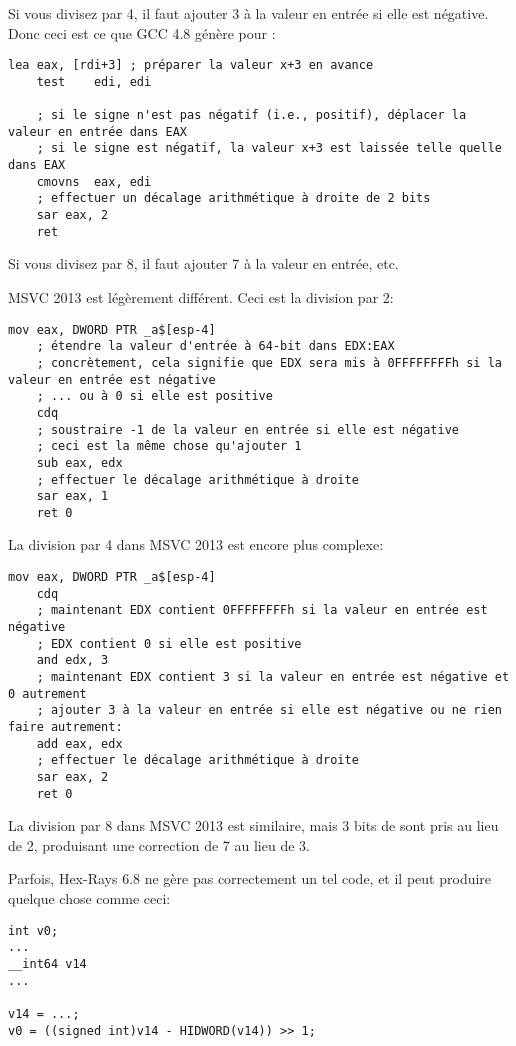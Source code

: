 Si vous divisez par 4, il faut ajouter 3 à la valeur en entrée si elle est négative.
Donc ceci est ce que GCC 4.8 génère pour :

\begin{lstlisting}[style=customasmx86]
	lea	eax, [rdi+3] ; préparer la valeur x+3 en avance
	test	edi, edi
	
	; si le signe n'est pas négatif (i.e., positif), déplacer la valeur en entrée dans EAX
	; si le signe est négatif, la valeur x+3 est laissée telle quelle dans EAX
	cmovns	eax, edi
	; effectuer un décalage arithmétique à droite de 2 bits
	sar	eax, 2
	ret
\end{lstlisting}

Si vous divisez par 8, il faut ajouter 7 à la valeur en entrée, etc.

MSVC 2013 est légèrement différent. Ceci est la division par 2:

\begin{lstlisting}[style=customasmx86]
	mov	eax, DWORD PTR _a$[esp-4]
	; étendre la valeur d'entrée à 64-bit dans EDX:EAX
	; concrètement, cela signifie que EDX sera mis à 0FFFFFFFFh si la valeur en entrée est négative
	; ... ou à 0 si elle est positive
	cdq
	; soustraire -1 de la valeur en entrée si elle est négative
	; ceci est la même chose qu'ajouter 1
	sub	eax, edx 
	; effectuer le décalage arithmétique à droite
	sar	eax, 1
	ret	0
\end{lstlisting}

La division par 4 dans MSVC 2013 est encore plus complexe:

\begin{lstlisting}[style=customasmx86]
	mov	eax, DWORD PTR _a$[esp-4]
	cdq
	; maintenant EDX contient 0FFFFFFFFh si la valeur en entrée est négative
	; EDX contient 0 si elle est positive
	and	edx, 3
	; maintenant EDX contient 3 si la valeur en entrée est négative et 0 autrement
	; ajouter 3 à la valeur en entrée si elle est négative ou ne rien faire autrement:
	add	eax, edx
	; effectuer le décalage arithmétique à droite
	sar	eax, 2
	ret	0
\end{lstlisting}

La division par 8 dans MSVC 2013 est similaire, mais 3 bits de \EDX sont pris au
lieu de 2, produisant une correction de 7 au lieu de 3.

Parfois, Hex-Rays 6.8 ne gère pas correctement un tel code, et il peut produire
quelque chose comme ceci:

\begin{lstlisting}
int v0;
...
__int64 v14
...
          
v14 = ...;
v0 = ((signed int)v14 - HIDWORD(v14)) >> 1;
\end{lstlisting}

